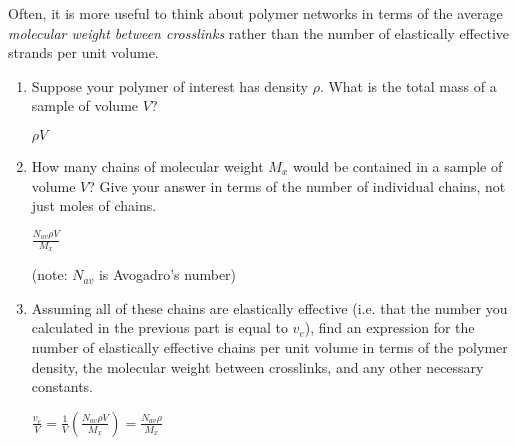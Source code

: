 \begin{activity}
\begin{exercises}
	\exercise Often, it is more useful to think about polymer networks in terms of the average \emph{molecular weight between crosslinks} rather than the number of elastically effective strands per unit volume.
	
		\begin{enumerate}
			\item Suppose your polymer of interest has density $\rho$.  What is the total mass of a sample of volume $V$?
			
				\begin{solution}
					$\rho V$
				\end{solution}
			
			\item How many chains of molecular weight $M_x$ would be contained in a sample of volume $V$?  Give your answer in terms of the  number of individual chains, not just moles of chains.
			
				\begin{solution}
					$\frac{N_{av} \rho V}{M_x}$
					
					(note: $N_{av}$ is Avogadro's number)
				\end{solution}
			
			\item Assuming all of these chains are elastically effective (i.e. that the number you calculated in the previous part is equal to $v_e$), find an expression for the number of elastically effective chains per unit volume in terms of the polymer density, the molecular weight between crosslinks, and any other necessary constants.
			
				\begin{solution}
					$\frac{v_e}{V} = \frac{1}{V}\left(\frac{N_{av} \rho V}{M_x}\right) = \frac{N_{av} \rho}{M_x}$
				\end{solution}
		\end{enumerate}
	
\end{exercises}


%
%	


	
\end{activity}